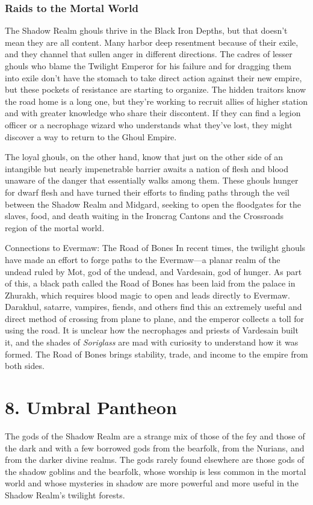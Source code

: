 \documentclass[10pt,a4paper,twoside,bg=print,twocolumn,openany,nodeprecatedcode]{dndbook}
\begin{document}
\subsection{Raids to the Mortal World}
The Shadow Realm ghouls thrive in the Black Iron Depths, but that doesn't mean they are all content. Many harbor deep resentment because of their exile, and they channel that sullen anger in different directions. The cadres of lesser ghouls who blame the Twilight Emperor for his failure and for dragging them into exile don't have the stomach to take direct action against their new empire, but these pockets of resistance are starting to organize. The hidden traitors know the road home is a long one, but they're working to recruit allies of higher station and with greater knowledge who share their discontent. If they can find a legion officer or a necrophage wizard who understands what they've lost, they might discover a way to return to the Ghoul Empire.

The loyal ghouls, on the other hand, know that just on the other side of an intangible but nearly impenetrable barrier awaits a nation of flesh and blood unaware of the danger that essentially walks among them. These ghouls hunger for dwarf flesh and have turned their efforts to finding paths through the veil between the Shadow Realm and Midgard, seeking to open the floodgates for the slaves, food, and death waiting in the Ironcrag Cantons and the Crossroads region of the mortal world.

\begin{DndSidebar}[float=!b]{Connections to Evermaw: The Road of Bones}
In recent times, the twilight ghouls have made an effort to forge paths to the Evermaw—a planar realm of the undead ruled by Mot, god of the undead, and Vardesain, god of hunger. As part of this, a black path called the Road of Bones has been laid from the palace in Zhurakh, which requires blood magic to open and leads directly to Evermaw. Darakhul, satarre, vampires, fiends, and others find this an extremely useful and direct method of crossing from plane to plane, and the emperor collects a toll for using the road. It is unclear how the necrophages and priests of Vardesain built it, and the shades of \textit{Soriglass} are mad with curiosity to understand how it was formed. The Road of Bones brings stability, trade, and income to the empire from both sides.



\end{DndSidebar}

\chapter{8. Umbral Pantheon}
The gods of the Shadow Realm are a strange mix of those of the fey and those of the dark and with a few borrowed gods from the bearfolk, from the Nurians, and from the darker divine realms. The gods rarely found elsewhere are those gods of the shadow goblins and the bearfolk, whose worship is less common in the mortal world and whose mysteries in shadow are more powerful and more useful in the Shadow Realm's twilight forests.
\end{document}
